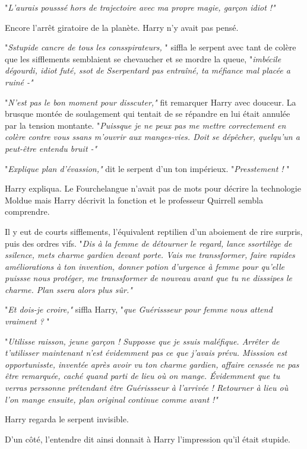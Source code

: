 "\emph{L'aurais pousssé hors de trajectoire avec ma propre magie, garçon idiot !"} 

Encore l'arrêt giratoire de la planète. Harry n'y avait pas pensé.

"\emph{Sstupide cancre de tous les consspirateurs,} " siffla le serpent avec tant de colère que les sifflements semblaient se chevaucher et se mordre la queue, "\emph{imbécile dégourdi, idiot futé, ssot de Sserpentard pas entraîné, ta méfiance mal placée a ruiné -"} 

"\emph{N'est pas le bon moment pour disscuter," } fit remarquer Harry avec douceur. La brusque montée de soulagement qui tentait de se répandre en lui était annulée par la tension montante. "\emph{Puissque je ne peux pas me mettre correctement en colère contre vous ssans m'ouvrir aux manges-vies. Doit se dépêcher, quelqu'un a peut-être entendu bruit -"} 

"\emph{Explique plan d'évassion," } dit le serpent d'un ton impérieux. "\emph{Presstement !} "

Harry expliqua. Le Fourchelangue n'avait pas de mots pour décrire la technologie Moldue mais Harry décrivit la fonction et le professeur Quirrell sembla comprendre.

Il y eut de courts sifflements, l'équivalent reptilien d'un aboiement de rire surpris, puis des ordres vifs. "\emph{Dis à la femme de détourner le regard, lance ssortilège de ssilence, mets charme gardien devant porte. Vais me transsformer, faire rapides améliorations à ton invention, donner potion d'urgence à femme pour qu'elle puissse nous protéger, me transsformer de nouveau avant que tu ne disssipes le charme. Plan ssera alors plus sûr."} 

"\emph{Et dois-je croire,"}  siffla Harry, "\emph{que Guérissseur pour femme nous attend vraiment ?} "

"\emph{Utilisse raisson, jeune garçon ! Supposse que je ssuis maléfique. Arrêter de t'utilisser maintenant n'est évidemment pas ce que j'avais prévu. Misssion est opportunisste, inventée après avoir vu ton charme gardien, affaire censsée ne pas être remarquée, caché quand parti de lieu où on mange. Évidemment que tu verras perssonne prétendant être Guérissseur à l'arrivée ! Retourner à lieu où l'on mange ensuite, plan original continue comme avant !"} 

Harry regarda le serpent invisible.

D'un côté, l'entendre dit ainsi donnait à Harry l'impression qu'il était stupide.

